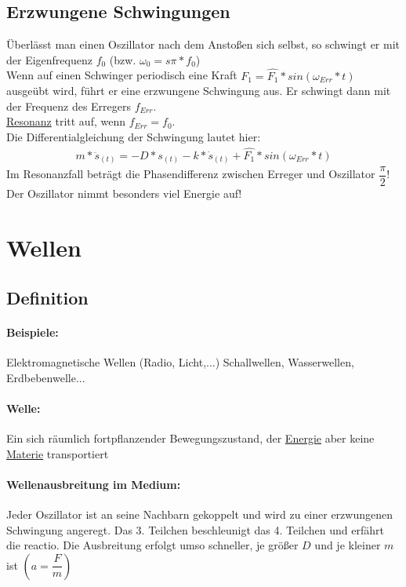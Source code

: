 \documentclass[12 pt]{article}
\numberwithin{equation}{section}
\begin{document}
	\subsection{Erzwungene Schwingungen}
	Überlässt man einen Oszillator nach dem Anstoßen sich selbst, so schwingt er mit der Eigenfrequenz $f_0$ (bzw. $\omega_0=s\pi*f_0$)\\
	Wenn auf einen Schwinger periodisch eine Kraft $F_1=\hat{F_1}*sin(\omega_{Err}*t)$ ausgeübt wird, führt er eine erzwungene Schwingung aus. Er schwingt dann mit der Frequenz des Erregers $f_{Err}$.\\
	\underline{Resonanz} tritt auf, wenn $f_{Err}=f_0$.\\
	Die Differentialgleichung der Schwingung lautet hier:\\
	\begin{align}
		m*\ddot{s}_{(t)}=-D*s_{(t)}-k*\dot{s}_{(t)}+\hat{F_1}*sin(\omega_{Err}*t)
	\end{align}
	Im Resonanzfall beträgt die Phasendifferenz zwischen Erreger und Oszillator $\dfrac{\pi}{2}$!\\
	Der Oszillator nimmt besonders viel Energie auf!\\
	
	\section{Wellen}
	
	\subsection{Definition}
	
	\paragraph{Beispiele:} Elektromagnetische Wellen (Radio, Licht,...)
	Schallwellen, Wasserwellen, Erdbebenwelle...
	
	\paragraph{Welle:} Ein sich räumlich fortpflanzender Bewegungszustand, der \underline{Energie} aber keine \underline{Materie} transportiert
	
	\paragraph{Wellenausbreitung im Medium:}Jeder Oszillator ist an seine Nachbarn gekoppelt und wird zu einer erzwungenen Schwingung angeregt.
	Das 3. Teilchen beschleunigt das 4. Teilchen und erfährt die reactio. Die Ausbreitung erfolgt umso schneller, je größer $D$ und je kleiner $m$ ist $(a=\dfrac{F}{m})$
	
\end{document}
